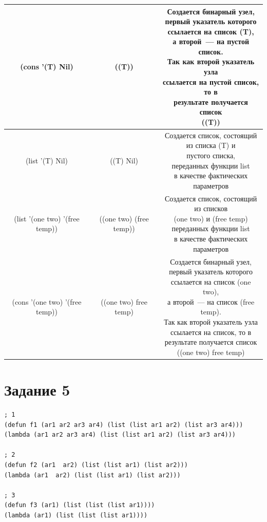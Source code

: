 \begin{center}
\begin{longtable}[c]{|c|c|c|}
		\hline
		(cons '(T) Nil) & ((T)) & \specialcell{Создается бинарный узел,\\первый указатель которого\\ссылается на список (T),\\а второй~--- на пустой список.\\Так как второй указатель узла\\ссылается на пустой список, то в\\результате получается список\\((T))}\\
		\hline
		(list '(T) Nil) & ((T) Nil) & \specialcell{Создается список, состоящий\\из списка (T) и\\пустого списка,\\переданных функции list\\в качестве фактических\\параметров}\\
		\hline
		(list '(one two) '(free temp)) & ((one two) (free temp)) & \specialcell{Создается список, состоящий\\из списков\\(one two) и (free temp)\\переданных функции list\\в качестве фактических\\параметров}\\
		\hline
		(cons '(one two) '(free temp)) & ((one two) free temp) & \specialcell{Создается бинарный узел,\\первый указатель которого\\ссылается на список (one two),\\а второй~--- на список (free temp).\\Так как второй указатель узла\\ссылается на список, то в\\результате получается список\\((one two) free temp)}\\
		\hline
	\end{longtable}
\end{center}

\clearpage

\section{Задание 5}

\begin{lstlisting}
; 1
(defun f1 (ar1 ar2 ar3 ar4) (list (list ar1 ar2) (list ar3 ar4)))
(lambda (ar1 ar2 ar3 ar4) (list (list ar1 ar2) (list ar3 ar4)))

; 2
(defun f2 (ar1  ar2) (list (list ar1) (list ar2)))
(lambda (ar1  ar2) (list (list ar1) (list ar2)))

; 3
(defun f3 (ar1) (list (list (list ar1))))
(lambda (ar1) (list (list (list ar1))))
\end{lstlisting}

